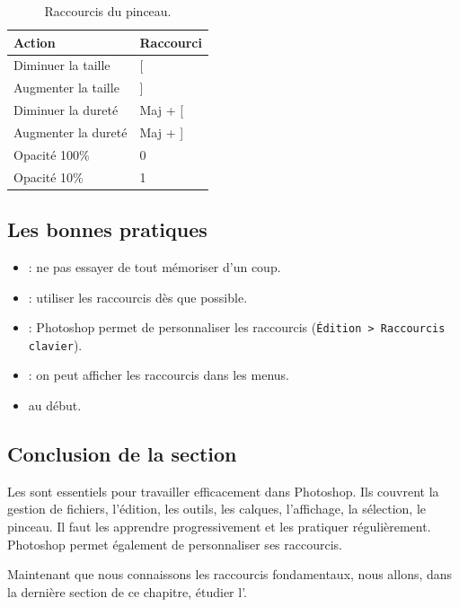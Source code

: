 \begin{table}[h!]
\centering
\begin{tabular}{@{}ll@{}}
\toprule
\textbf{Action} & \textbf{Raccourci} \\
\midrule
Diminuer la taille & [ \\
Augmenter la taille & ] \\
Diminuer la dureté & Maj + [ \\
Augmenter la dureté & Maj + ] \\
Opacité 100\% & 0 \\
Opacité 10\% & 1 \\
\bottomrule
\end{tabular}
\caption{Raccourcis du pinceau.}
\end{table}

\subsection{Les bonnes pratiques}

\begin{itemize}
    \item {} : ne pas essayer de tout mémoriser d'un coup.
    \item {} : utiliser les raccourcis dès que possible.
    \item {} : Photoshop permet de personnaliser les raccourcis (\texttt{Édition > Raccourcis clavier}).
    \item {} : on peut afficher les raccourcis dans les menus.
    \item {} au début.
\end{itemize}

\subsection*{Conclusion de la section}

Les  sont essentiels pour travailler efficacement dans Photoshop. Ils couvrent la gestion de fichiers, l'édition, les outils, les calques, l'affichage, la sélection, le pinceau. Il faut les apprendre progressivement et les pratiquer régulièrement. Photoshop permet également de personnaliser ses raccourcis.

Maintenant que nous connaissons les raccourcis fondamentaux, nous allons, dans la dernière section de ce chapitre, étudier l'.

